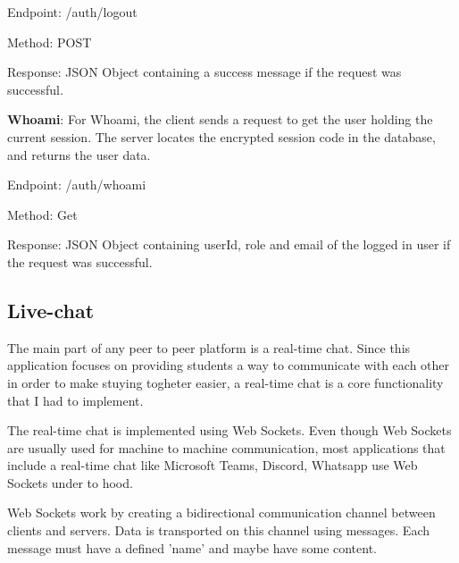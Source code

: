 Endpoint: /auth/logout

Method: POST

Response: JSON Object containing a success message if the request was successful.

\textbf{Whoami}: For Whoami, the client sends a request to get the user holding the current session. The server locates the encrypted session code in the database, and returns the user data.

Endpoint: /auth/whoami

Method: Get

Response: JSON Object containing userId, role and email of the logged in user if the request was successful.

\subsection{Live-chat}
The main part of any peer to peer platform is a real-time chat. Since this application focuses on providing students a way to communicate with each other in order to make stuying togheter easier, a real-time chat is a core functionality that I had to implement.

The real-time chat is implemented using Web Sockets. Even though Web Sockets are usually used for machine to machine communication, most applications that include a real-time chat like Microsoft Teams, Discord, Whatsapp use Web Sockets under to hood.

Web Sockets work by creating a bidirectional communication channel between clients and servers. Data is transported on this channel using messages. Each message must have a defined 'name' and maybe have some content.

